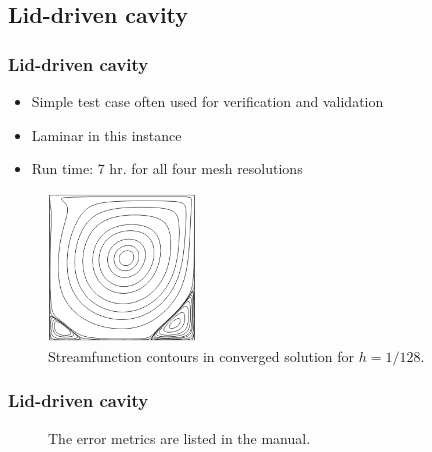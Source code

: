 \subsection{Lid-driven cavity}

\begin{frame}
    \frametitle{Lid-driven cavity}
\begin{itemize}
\item Simple test case often used for verification and validation
\item Laminar in this instance
\item Run time: 7 hr. for all four mesh resolutions
\end{itemize}
\begin{figure}
\centering
\includegraphics[width=0.35\textwidth]{./driven_cavity/driven_cavity_streamfunction.png}
\caption{Streamfunction contours in converged solution for $h=1/128$.}
\end{figure}
\end{frame}

\begin{frame}
    \frametitle{Lid-driven cavity}
\begin{figure}
\centering
{}
\hspace{10mm}
\caption{The error metrics are listed in the manual.}
\end{figure}
\end{frame}
